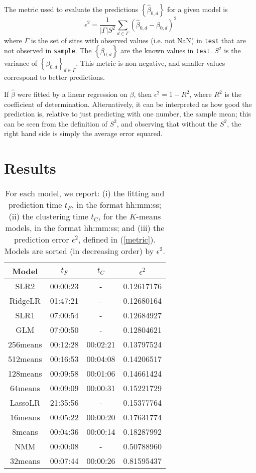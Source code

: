 \documentclass{article} %
\begin{document}
The metric used to evaluate the predictions $\left\{ \hat{\beta}_{0,d}\right\}$ for a given model is 
\begin{equation} \label{metric}
\epsilon^2 = \frac{ 1}{|\Gamma| S^{2}} \sum_{d \in \Gamma} \left( \hat{\beta}_{0,d} -  \beta_{0,d}\right)^2 
\end{equation}
where $\Gamma$ is the set of sites with observed values (i.e. not NaN) in \texttt{test} that are not observed in \texttt{sample}. The $\left\{\beta_{0,d}\right\}$ are the known values in \texttt{test}. $S^2$ is the variance of $\left\{\beta_{0,d}\right\}_{d \in \Gamma}$. This metric is non-negative, and smaller values correspond to better predictions.

If $\hat{\beta}$ were fitted by a linear regression on $\beta$, then $\epsilon^2 = 1 - R^2$, where $R^2$ is the coefficient of determination. Alternatively, it can be interpreted as how good the prediction is, relative to just predicting with one number, the sample mean; this can be seen from the definition of $S^2$, and observing that without the $S^2$, the right hand side is simply the average error squared.

\section{Results}

\begin{table}[htbp]
\small
   \centering
   \begin{tabular}{@{}|c|c|c|c|@{}} %
  \cline{1-4}
Model & $t_F$ & $t_C$ & $\epsilon^2$ \\ \hline
\hline
SLR2 & 00:00:23 & - & 0.12617176 \\ \hline
RidgeLR & 01:47:21 & - & 0.12680164 \\ \hline
SLR1 & 07:00:54 & - & 0.12684927 \\ \hline
GLM & 07:00:50 & - & 0.12804621 \\ \hline
256means & 00:12:28 & 00:02:21 & 0.13797524 \\ \hline
512means & 00:16:53 & 00:04:08 & 0.14206517 \\ \hline
128means & 00:09:58 & 00:01:06 & 0.14661424 \\ \hline
64means & 00:09:09 & 00:00:31 & 0.15221729 \\ \hline
LassoLR & 21:35:56 & - & 0.15377764 \\ \hline
16means & 00:05:22 & 00:00:20 & 0.17631774 \\ \hline
8means & 00:04:36 & 00:00:14 & 0.18287992 \\ \hline
NMM & 00:00:08 & - & 0.50788960 \\ \hline
32means & 00:07:44 & 00:00:26 & 0.81595437 \\ \hline
   \end{tabular}
   \caption{For each model, we report: (i) the fitting and prediction time $t_F$, in the format hh:mm:ss; (ii) the clustering time $t_C$, for the $K$-means models, in the format hh:mm:ss; and (iii) the prediction error $\epsilon^2$, defined in (\ref{metric}). Models are sorted (in decreasing order) by $\epsilon^2$.}
   \label{tab:models}
\end{table}
\end{document}
